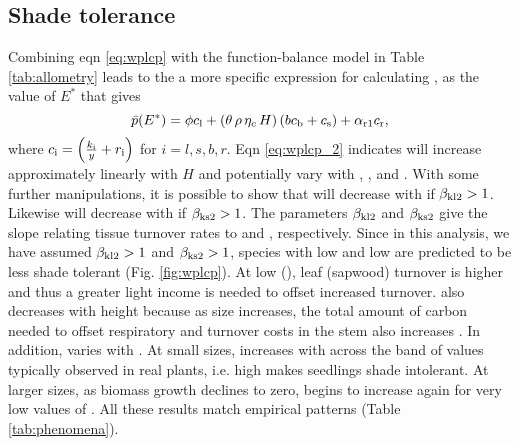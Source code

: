 \documentclass[9pt,twocolumn,twoside,lineno]{pnas-new}
\begin{document}
\subsection{Shade tolerance}
Combining eqn \ref{eq:wplcp} with the function-balance model in Table \ref{tab:allometry} leads to the a more specific expression for calculating {\wplcp}, as the value of $E^*$ that gives
\begin{equation}\label{eq:wplcp_2}
\bar{p}(E^*) =
      \phi c_{\rm l} +
      \left(\theta \, \rho \, \eta_c \, H\right)
        \left(b c_{\rm b}
            + c_{\rm s}\right) +
      \alpha_{\rm r1} c_{\rm r},
\end{equation}
where $c_{\rm i} = \left(\frac{k_{\rm i}}{y} + r_{\rm i}\right)$ for $i=l,s,b,r$.
Eqn \ref{eq:wplcp_2} indicates {\wplcp} will increase approximately linearly with $H$ and potentially vary with {\nitrogen}, {\lma}, and {\wood}. With some further manipulations, it is possible to show that {\wplcp} will decrease with {\lma} if $\beta_{{\rm kl2}} >1$. Likewise {\wplcp} will decrease with {\wood} if $\beta_{{\rm ks2}} >1$. The parameters $\beta_{{\rm kl2}}$ and $\beta_{{\rm ks2}}$ give the slope relating tissue turnover rates to {\lma} and {\wood}, respectively. Since in this analysis, we have assumed $\beta_{{\rm kl2}} >1$ and $\beta_{{\rm ks2}} >1$, species with low {\lma} and low {\wood} are predicted to be less shade tolerant (Fig. \ref{fig:wplcp}). At low {\lma} ({\wood}), leaf (sapwood) turnover is higher and thus a greater light income is needed to offset increased turnover. {\wplcp} also decreases with height because as size increases, the total amount of carbon needed to offset respiratory and turnover costs in the stem also increases \citep{Givnish-1988}. In addition, {\wplcp} varies with {\nitrogen}. At small sizes, {\wplcp} increases with {\nitrogen} across the band of values typically observed in real plants, i.e. high {\nitrogen} makes seedlings shade intolerant. At larger sizes, as biomass growth declines to zero, {\wplcp} begins to increase again for very low values of {\nitrogen}. All these results  match empirical patterns (Table \ref{tab:phenomena}).



\newcommand{\sepp}{{\color{grey}/}}
\newcommand{\upup}{$\uparrow\,\uparrow$}
\newcommand{\updo}{$\uparrow\,\downarrow$}
\newcommand{\dodo}{$\downarrow\,\downarrow$}
\newcommand{\upfl}{$\uparrow$\,--}
\newcommand{\flup}{--$\,\uparrow$}
\newcommand{\dofl}{$\downarrow\,$--}
\newcommand{\doup}{$\downarrow\,\uparrow$}
\newcommand{\fldo}{--$\,\downarrow$}
\end{document}
